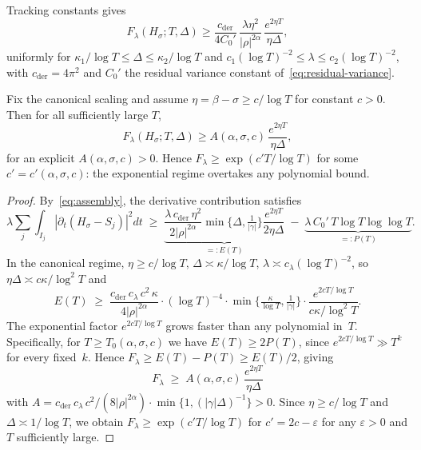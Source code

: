 Tracking constants gives
\begin{equation}
F_\lambda(H_\sigma;T,\Delta)
  \ge \frac{c_{\mathrm{der}}}{4C_0'}\,
        \frac{\lambda\eta^2}{|\rho|^{2\alpha}}\,
        \frac{e^{2\eta T}}{\eta\Delta},
\label{eq:uniform-lb}
\end{equation}
uniformly for $\kappa_1/\log T \le \Delta \le \kappa_2/\log T$ and
$c_1(\log T)^{-2}\le \lambda \le c_2(\log T)^{-2}$,
with $c_{\mathrm{der}}=4\pi^2$ and $C_0'$ the residual variance constant
of~\eqref{eq:residual-variance}.

\begin{lemma}\label{lem:threshold}
Fix the canonical scaling and assume $\eta=\beta-\sigma\ge c/\log T$ for constant $c>0$.
Then for all sufficiently large $T$,
\[
F_\lambda(H_\sigma;T,\Delta)
   \ge A(\alpha,\sigma,c)\,\frac{e^{2\eta T}}{\eta\Delta},
\]
for an explicit $A(\alpha,\sigma,c)>0$.
Hence $F_\lambda\ge\exp(c' T/\log T)$ for some $c'=c'(\alpha,\sigma,c)$:
the exponential regime overtakes any polynomial bound.
\end{lemma}

\begin{proof}
By~\eqref{eq:assembly}, the derivative contribution satisfies
\[
\lambda\!\sum_j\!\int_{I_j}\!|\partial_t(H_\sigma-S_j)|^2dt
\;\ge\;
\underbrace{\frac{\lambda\,c_{\mathrm{der}}\,\eta^2}{2|\rho|^{2\alpha}}
\min\!\bigl\{\Delta,\tfrac{1}{|\gamma|}\bigr\}
\frac{e^{2\eta T}}{2\eta\Delta}}_{\displaystyle =:E(T)}
\;-\;
\underbrace{\lambda\,C_0'\,T\log T\log\log T}_{\displaystyle =:P(T)}.
\]
In the canonical regime, $\eta\ge c/\log T$, $\Delta\asymp\kappa/\log T$,
$\lambda\asymp c_\lambda(\log T)^{-2}$, so
$\eta\Delta\asymp c\kappa/\log^2 T$ and
\[
E(T)\;\ge\;
\frac{c_{\mathrm{der}}\,c_\lambda\,c^2\,\kappa}{4|\rho|^{2\alpha}}
\cdot(\log T)^{-4}\cdot
\min\!\bigl\{\tfrac{\kappa}{\log T},\tfrac{1}{|\gamma|}\bigr\}\cdot
\frac{e^{2cT/\log T}}{c\kappa/\log^2 T}.
\]
The exponential factor $e^{2cT/\log T}$ grows faster than any polynomial in~$T$.
Specifically, for $T\ge T_0(\alpha,\sigma,c)$ we have
$E(T)\ge 2P(T)$, since $e^{2cT/\log T}\gg T^k$ for every fixed~$k$.
Hence $F_\lambda\ge E(T)-P(T)\ge E(T)/2$, giving
\[
F_\lambda\;\ge\; A(\alpha,\sigma,c)\,\frac{e^{2\eta T}}{\eta\Delta}
\]
with $A=c_{\mathrm{der}}\,c_\lambda\,c^2/(8|\rho|^{2\alpha})
\cdot\min\{1,(|\gamma|\Delta)^{-1}\}>0$.
Since $\eta\ge c/\log T$ and $\Delta\asymp 1/\log T$, we obtain
$F_\lambda\ge\exp(c'T/\log T)$ for
$c'=2c-\varepsilon$ for any $\varepsilon>0$ and $T$ sufficiently large.
\end{proof}

